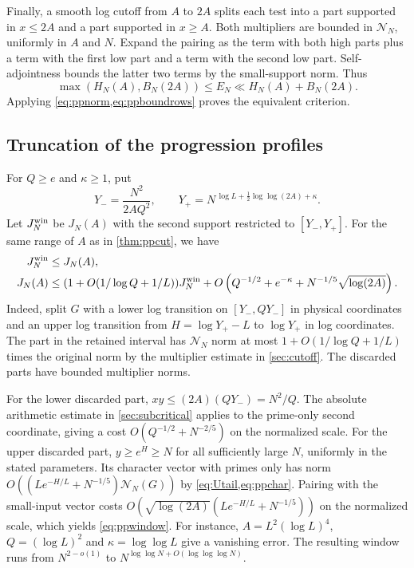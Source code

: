 \documentclass[11pt,a4paper]{article}
\numberwithin{equation}{section}
\newcommand{\NN}{\mathcal N_N}
\begin{document}
Finally, a smooth log cutoff from $A$ to $2A$ splits each
test into a part supported in $x\le2A$ and a part supported in
$x\ge A$. Both multipliers are bounded in $\NN$, uniformly
in $A$ and $N$. Expand the pairing as the term with both
high parts plus a term with the first low part and a term
with the second low part. Self-adjointness bounds the latter
two terms by the small-support norm. Thus
\[
  \max(H_N(A),B_N(2A))\le E_N\ll H_N(A)+B_N(2A).
\]
Applying \cref{eq:ppnorm,eq:ppboundrows} proves the
equivalent criterion.

\subsection{Truncation of the progression profiles}

For $Q\ge e$ and $\kappa\ge1$, put
\[
 Y_-=\frac{N^2}{2A Q^2},\qquad
 Y_+=N^{\,\log L+\frac12\log\log(2A)+\kappa}.
\]
Let $J_N^{\rm win}$ be $J_N(A)$ with the second
support restricted to $[Y_-,Y_+]$. For the same range of $A$
as in \cref{thm:ppcut}, we have
\begin{align}
 J_N^{\rm win}&\le J_N(A), \notag\\
 J_N(A)&\le
  (1+O(1/\log Q+1/L))J_N^{\rm win}
       +O\left(Q^{-1/2}+e^{-\kappa}
                  +N^{-1/5}\sqrt{\log(2A)}\right).
 \label{eq:ppwindow}
\end{align}
Indeed, split $G$ with a lower log transition on $[Y_-,QY_-]$
in physical coordinates and an upper log transition from
$H=\log Y_+-L$ to $\log Y_+$ in log coordinates.
The part in the retained interval has $\NN$ norm at most
$1+O(1/\log Q+1/L)$ times the original norm by the
multiplier estimate in \cref{sec:cutoff}. The discarded
parts have bounded multiplier norms.

For the lower discarded part, $xy\le (2A)(QY_-)=N^2/Q$.
The absolute arithmetic estimate in \cref{sec:subcritical}
applies to the prime-only second coordinate, giving a cost
$O(Q^{-1/2}+N^{-2/5})$ on the normalized scale.
For the upper discarded part, $y\ge e^H\ge N$ for all
sufficiently large $N$, uniformly in the stated parameters.
Its character vector with primes only has norm
$O((Le^{-H/L}+N^{-1/5})\NN(G))$ by
\cref{eq:Utail,eq:ppchar}. Pairing with the small-input vector
costs $O(\sqrt{\log(2A)}(Le^{-H/L}+N^{-1/5}))$
on the normalized scale, which yields \cref{eq:ppwindow}.
For instance, $A=L^2(\log L)^4$, $Q=(\log L)^2$ and
$\kappa=\log\log L$ give a vanishing error. The resulting
window runs from $N^{2-o(1)}$ to
$N^{\log\log N+O(\log\log\log N)}$.
\end{document}
